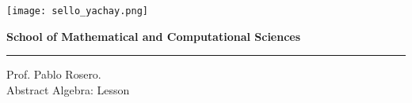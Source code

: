 \begin{minipage}[c]{30mm}
\texttt{[image: sello\_yachay.png]}
\end{minipage}
\begin{minipage}[c]{95mm}
\textbf{School of Mathematical and Computational Sciences}
\end{minipage}
\begin{minipage}[c]{2mm}
\rule[2.5mm]{0.3mm}{15mm}
\end{minipage}
\begin{minipage}[c]{50mm}
Prof. Pablo Rosero.\\ Abstract Algebra: Lesson \contador{}
\end{minipage}

\hrulefill
\vspace{3mm}